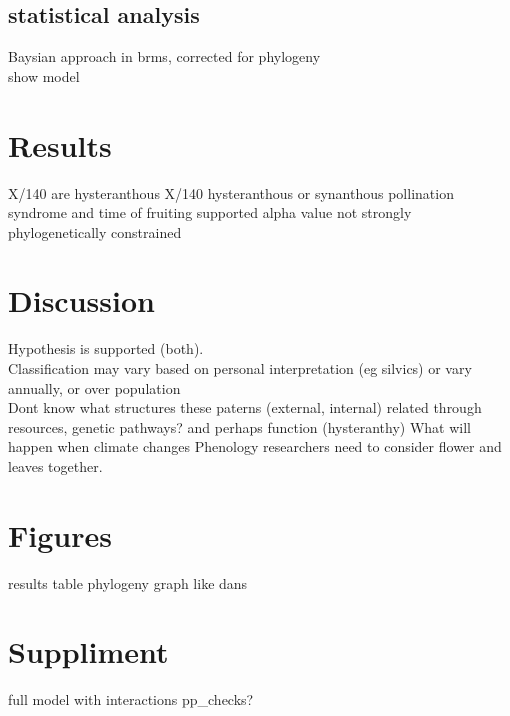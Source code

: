 \documentclass{article}\usepackage[]{graphicx}\usepackage[]{color}
\begin{document}
\subsection{statistical analysis}
Baysian approach in brms, corrected for phylogeny\\
show model
\section{Results}
X/140 are hysteranthous
X/140 hysteranthous or synanthous
pollination syndrome and time of fruiting supported
alpha value not strongly phylogenetically constrained
\section{Discussion}
Hypothesis is supported (both).\\
Classification may vary based on personal interpretation (eg silvics) or vary annually, or over population\\
Dont know what structures these paterns (external, internal)
related through resources, genetic pathways? and perhaps function (hysteranthy)
What will happen when climate changes
Phenology researchers need to consider flower and leaves together.

\section{Figures}
results table
phylogeny
graph like dans
\section{Suppliment}
full model with interactions
pp_checks?
\end{document}

